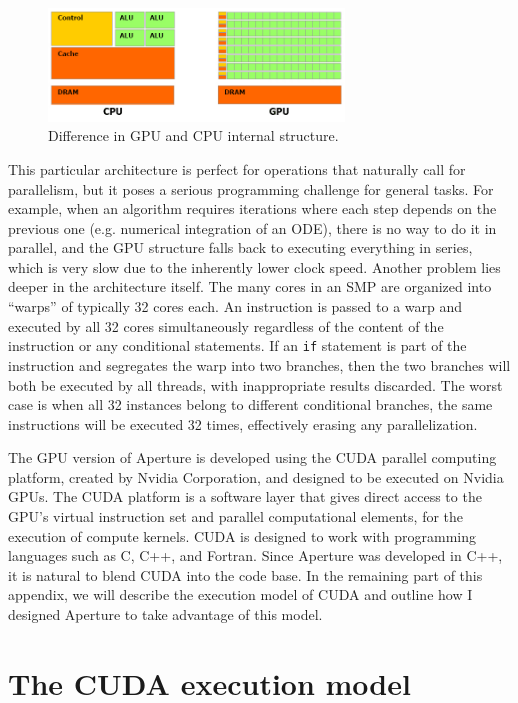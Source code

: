 \begin{figure}[h]
  \centering
  \includegraphics[width=0.7\textwidth]{pics/appendix/gputech_f2.png}
  \caption{Difference in GPU and CPU internal structure.}
  \label{fig:gpu-vs-cpu}
\end{figure}

This particular architecture is perfect for operations that naturally call for
parallelism, but it poses a serious programming challenge for general tasks. For
example, when an algorithm requires iterations where each step depends on the
previous one (e.g. numerical integration of an ODE), there is no way to do it in
parallel, and the GPU structure falls back to executing everything in series,
which is very slow due to the inherently lower clock speed. Another problem lies
deeper in the architecture itself. The many cores in an SMP are organized into
``warps'' of typically 32 cores each. An instruction is passed to a warp and
executed by all 32 cores simultaneously regardless of the content of the
instruction or any conditional statements. If an \verb!if! statement is part of
the instruction and segregates the warp into two branches, then the two branches
will both be executed by all threads, with inappropriate results discarded. The
worst case is when all 32 instances belong to different conditional branches,
the same instructions will be executed 32 times, effectively erasing any
parallelization.

The GPU version of Aperture is developed using the CUDA parallel computing
platform, created by Nvidia Corporation, and designed to be executed on Nvidia
GPUs. The CUDA platform is a software layer that gives direct access to the
GPU's virtual instruction set and parallel computational elements, for the
execution of compute kernels. CUDA is designed to work with programming
languages such as C, C++, and Fortran. Since Aperture was developed in C++, it
is natural to blend CUDA into the code base. In the remaining part of this
appendix, we will describe the execution model of CUDA and outline how I
designed Aperture to take advantage of this model.

\section{The CUDA execution model}
\label{sec:cuda-model}

